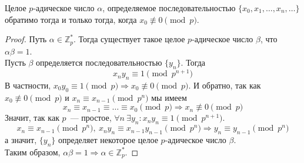 \documentclass[11pt]{report}
\begin{document}
    \begin{theorem} \label{UnitP-adic}
        Целое $p$-адическое число $\alpha$, определяемое
        последовательностью $\{ x_0, x_1, \ldots, x_n, \ldots \}$ обратимо тогда и только тогда, когда $x_0 \not\equiv 0 \pmod{p}$.
    \end{theorem}
    \begin{proof}
        Путь $\alpha \in \mathbb{Z}_p^{*}$. Тогда существует такое целое $p$-адическое число $\beta$, что $\alpha \beta = 1$. \\
        Пусть $\beta$ определяется последовательностью $\{ y_n \}$. Тогда
        \[ x_n y_n \equiv 1 \pmod{p^{n + 1}} \]
        В частности, $x_0 y_0 \equiv 1 \pmod{p} \Rightarrow x_0 \not\equiv 0 \pmod{p}$. И обратно, так как $x_0 \not\equiv 0 \pmod{p}$ и $x_n \equiv x_{n - 1} \pmod{p^n}$ мы имеем
        \[ x_n \equiv x_{n - 1} \equiv \ldots \equiv x_0 \pmod{p} \Rightarrow x_n \not\equiv 0 \pmod{p} \]
        Значит, так как $p$~--- простое, $\forall n \ \exists y_n \colon x_n y_n \equiv 1 \pmod{p^{n + 1}}$.
        \[ x_n \equiv x_{n - 1} \pmod{p^n}, \ x_n y_n \equiv x_{n - 1} y_{n - 1} \pmod{p^n} \Rightarrow y_n \equiv y_{n - 1} \pmod{p^n} \]
        а значит, $\{ y_n \}$ определяет некоторое целое $p$-адическое число $\beta$.\\
        Таким образом, $\alpha \beta = 1 \Rightarrow \alpha \in \mathbb{Z}_p^{*}$.
    \end{proof}
\end{document}
